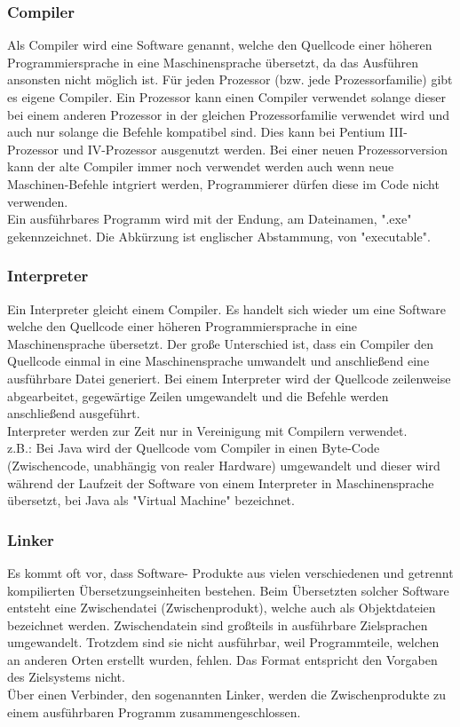 \documentclass[12pt,a4paper]{report}
\begin{document}
\subsubsection{Compiler}
Als Compiler wird eine Software genannt, welche den Quellcode einer höheren Programmiersprache in eine Maschinensprache übersetzt, da das Ausführen ansonsten nicht möglich ist. Für jeden Prozessor (bzw. jede Prozessorfamilie) gibt es eigene Compiler. Ein Prozessor kann einen Compiler verwendet solange dieser bei einem anderen Prozessor in der gleichen Prozessorfamilie verwendet wird und auch nur solange die Befehle kompatibel sind. Dies kann bei Pentium III-Prozessor und IV-Prozessor ausgenutzt werden. Bei einer neuen Prozessorversion kann der alte Compiler immer noch verwendet werden auch wenn neue Maschinen-Befehle intgriert werden, Programmierer dürfen diese im Code nicht verwenden.\\
Ein ausführbares Programm wird mit der Endung, am Dateinamen, "{}.exe"{} gekennzeichnet. Die Abkürzung ist englischer Abstammung, von "{}executable"{}.

\subsubsection{Interpreter}
Ein Interpreter gleicht einem Compiler. Es handelt sich wieder um eine Software welche den Quellcode einer höheren Programmiersprache in eine Maschinensprache übersetzt. Der große Unterschied ist, dass ein Compiler den Quellcode einmal in eine Maschinensprache umwandelt und anschließend eine ausführbare Datei generiert. Bei einem Interpreter wird der Quellcode zeilenweise abgearbeitet, gegewärtige Zeilen umgewandelt und die Befehle werden anschließend ausgeführt.
\\Interpreter werden zur Zeit nur in Vereinigung mit Compilern verwendet. \\
z.B.: Bei Java wird der Quellcode vom Compiler in einen Byte-Code (Zwischencode, unabhängig von realer Hardware) umgewandelt und dieser wird während der Laufzeit der Software von einem Interpreter in Maschinensprache übersetzt, bei Java als "{}Virtual Machine"{} bezeichnet.

\subsubsection{Linker}
Es kommt oft vor, dass Software- Produkte aus vielen verschiedenen und getrennt kompilierten Übersetzungseinheiten bestehen. Beim Übersetzten solcher Software entsteht eine Zwischendatei (Zwischenprodukt), welche auch als Objektdateien bezeichnet werden. Zwischendatein sind großteils in ausführbare Zielsprachen umgewandelt. Trotzdem sind sie nicht ausführbar, weil Programmteile, welchen an anderen Orten erstellt wurden, fehlen. Das Format entspricht den Vorgaben des Zielsystems nicht.
\\Über einen Verbinder, den sogenannten Linker, werden die Zwischenprodukte zu einem ausführbaren Programm zusammengeschlossen.
\end{document}
